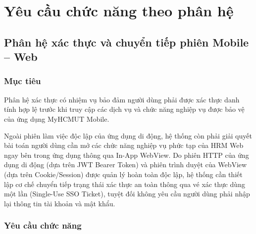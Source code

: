 \section{Yêu cầu chức năng theo phân hệ}
\label{sec:yeucau_chucnang}

\subsection{Phân hệ xác thực và chuyển tiếp phiên Mobile -- Web}
\label{subsec:req_auth}

\subsubsection{Mục tiêu}
Phân hệ xác thực có nhiệm vụ bảo đảm người dùng phải được xác thực danh tính hợp lệ trước khi truy cập các dịch vụ và chức năng nghiệp vụ được bảo vệ của ứng dụng MyHCMUT Mobile.

Ngoài phiên làm việc độc lập của ứng dụng di động, hệ thống còn phải giải quyết bài toán người dùng cần mở các chức năng nghiệp vụ phức tạp của HRM Web ngay bên trong ứng dụng thông qua In-App WebView. Do phiên HTTP của ứng dụng di động (dựa trên JWT Bearer Token) và phiên trình duyệt của WebView (dựa trên Cookie/Session) được quản lý hoàn toàn độc lập, hệ thống cần thiết lập cơ chế chuyển tiếp trạng thái xác thực an toàn thông qua vé xác thực dùng một lần (Single-Use SSO Ticket), tuyệt đối không yêu cầu người dùng phải nhập lại thông tin tài khoản và mật khẩu.

\subsubsection{Yêu cầu chức năng}

